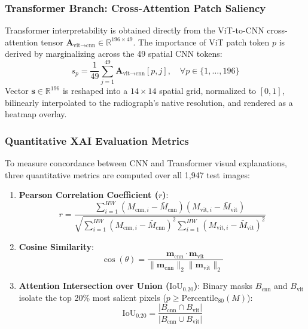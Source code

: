 \documentclass[journal]{IEEEtran}
\begin{document}
\subsubsection{Transformer Branch: Cross-Attention Patch Saliency}
Transformer interpretability is obtained directly from the ViT-to-CNN cross-attention tensor $\mathbf{A}_{\text{vit}\to\text{cnn}} \in \mathbb{R}^{196 \times 49}$. The importance of ViT patch token $p$ is derived by marginalizing across the 49 spatial CNN tokens:
\begin{equation}
s_p = \frac{1}{49} \sum_{j=1}^{49} \mathbf{A}_{\text{vit}\to\text{cnn}}[p, j], \quad \forall p \in \{1, \dots, 196\}
\end{equation}
Vector $\mathbf{s} \in \mathbb{R}^{196}$ is reshaped into a $14 \times 14$ spatial grid, normalized to $[0, 1]$, bilinearly interpolated to the radiograph's native resolution, and rendered as a heatmap overlay.

\subsubsection{Quantitative XAI Evaluation Metrics}
To measure concordance between CNN and Transformer visual explanations, three quantitative metrics are computed over all 1,947 test images:
\begin{enumerate}
    \item \textbf{Pearson Correlation Coefficient ($r$)}:
    \begin{equation}
    r = \frac{\sum_{i=1}^{HW} (M_{\text{cnn}, i} - \bar{M}_{\text{cnn}})(M_{\text{vit}, i} - \bar{M}_{\text{vit}})}{\sqrt{\sum_{i=1}^{HW} (M_{\text{cnn}, i} - \bar{M}_{\text{cnn}})^2 \sum_{i=1}^{HW} (M_{\text{vit}, i} - \bar{M}_{\text{vit}})^2}}
    \end{equation}
    \item \textbf{Cosine Similarity}:
    \begin{equation}
    \cos(\theta) = \frac{\mathbf{m}_{\text{cnn}} \cdot \mathbf{m}_{\text{vit}}}{\|\mathbf{m}_{\text{cnn}}\|_2 \|\mathbf{m}_{\text{vit}}\|_2}
    \end{equation}
    \item \textbf{Attention Intersection over Union ($\text{IoU}_{0.20}$)}:
    Binary masks $B_{\text{cnn}}$ and $B_{\text{vit}}$ isolate the top 20\% most salient pixels ($p \ge \text{Percentile}_{80}(M)$):
    \begin{equation}
    \text{IoU}_{0.20} = \frac{|B_{\text{cnn}} \cap B_{\text{vit}}|}{|B_{\text{cnn}} \cup B_{\text{vit}}|}
    \end{equation}
\end{enumerate}
\end{document}
